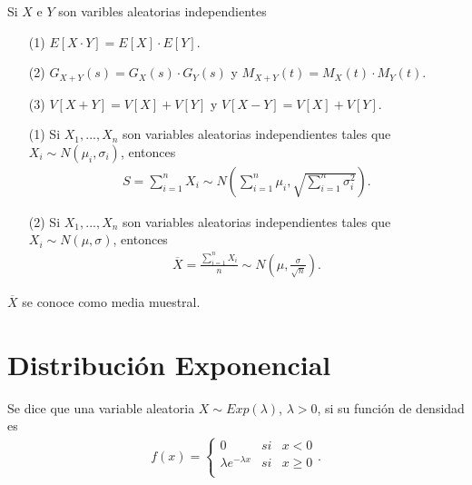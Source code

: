 \begin{obs}
    Si $X$ e $Y$ son varibles aleatorias independientes
    \begin{enumerate}
        \item[(1)] $E[X \cdot Y] = E[X] \cdot E[Y]$.
        \item[(2)] $G_{X + Y}(s) = G_X(s) \cdot G_Y(s)$ y $M_{X + Y}(t) = M_X(t) \cdot M_Y(t)$.
        \item[(3)] $V[X + Y] = V[X] + V[Y]$ y $V[X - Y] = V[X] + V[Y]$.
    \end{enumerate}
\end{obs}

\begin{prop}
    \begin{enumerate}
        \item[(1)] Si $X_1, ..., X_n$ son variables aleatorias independientes tales que $X_i \sim N(\mu_i, \sigma_i)$, entonces
              \begin{align*}
                  S = \sum_{i=1}^{n}{X_i} \sim N\left(\sum_{i=1}^{n}{\mu_i}, \sqrt{\sum_{i=1}^{n}{\sigma_i^2}}\right).
              \end{align*}
        \item[(2)] Si $X_1, ..., X_n$ son variables aleatorias independientes tales que $X_i \sim N(\mu, \sigma)$, entonces
              \begin{align*}
                  \overline{X} = \frac{\sum_{i=1}^{n}{X_i}}{n} \sim N\left( \mu, \frac{\sigma}{\sqrt{n}}\right).
              \end{align*}
    \end{enumerate}
    $\overline{X}$ se conoce como media muestral.
\end{prop}

\section{Distribución Exponencial}

\begin{defi}
    Se dice que una variable aleatoria $X \sim Exp(\lambda)$, $\lambda > 0$, si su función de densidad es
    \begin{align*}
        f(x) = \left\{ \begin{array}{lcc}
                           0                      & si & x < 0   \\
                           \lambda e^{-\lambda x} & si & x \ge 0 \\
                       \end{array}
        \right. .
    \end{align*}
\end{defi}

